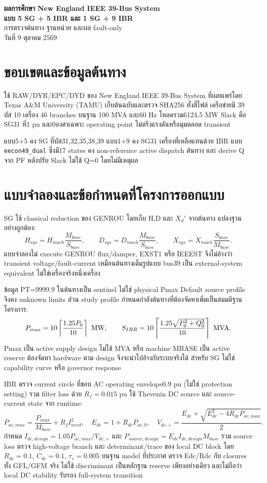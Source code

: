 \documentclass[12pt,a4paper]{article}
\begin{document}
\begin{center}
{\Large\bfseries ผลการศึกษา New England IEEE 39-Bus System\\แบบ 5 SG + 5 IBR และ 1 SG + 9 IBR}\\[6pt]
การตรวจต้นทาง ฐานหน่วย และผล fault-only\\
วันที่ 9 ตุลาคม 2569
\end{center}
\section{ขอบเขตและข้อมูลต้นทาง}
ใช้ RAW/DYR/EPC/DYD ของ New England IEEE 39-Bus System ที่เผยแพร่โดย Texas A\&M University (TAMU) เก็บต้นฉบับและตรวจ SHA256 ทั้งสี่ไฟล์ เครือข่ายมี 39 บัส 10 เครื่อง 46 branches บนฐาน 100 MVA และ60 Hz โหลดรวม6124.5 MW Slack คือ SG31 ที่1 pu และ0องศาเฉพาะ operating point ไม่ตรึงแรงดันหรือมุมตลอด transient

แบบ5+5 คง SG ที่บัส31,32,35,38,39 แบบ1+9 คง SG31 เครื่องที่เหลือแทนด้วย IBR แบบ \texttt{eecon49\_dual} ซึ่งมี17 states คง non-reference active dispatch ต้นทาง และ derive Q จาก PF หลังปรับ Slack ไม่ใช้ Q=0 โดยไม่มีเหตุผล

\section{แบบจำลองและข้อกำหนดที่โครงการออกแบบ}
SG ใช้ classical reduction ของ GENROU โดยเก็บ H,D และ $X_d'$ จากต้นทาง แปลงฐานอย่างถูกต้อง:
\[
H_{sys}=H_{mach}\frac{M_{base}}{S_{base}},\qquad
D_{sys}=D_{mach}\frac{M_{base}}{S_{base}},\qquad
X_{sys}=X_{mach}\frac{S_{base}}{M_{base}}.
\]
แบบจำลองไม่ execute GENROU flux/damper, EXST1 หรือ IEEEST จึงไม่อ้างว่า transient voltage/fault-current เหมือนต้นทางเต็มรูปแบบ bus39 เป็น external-system equivalent ไม่ใช่เครื่องจริงหนึ่งเครื่อง

ข้อมูล PT=9999.9 ในต้นทางเป็น sentinel ไม่ใช่ physical Pmax Default source profile จึงคง unknown limits ส่วน study profile กำหนดกำลังต้นทางที่ต้องจัดหาเพิ่มเป็นสมมติฐานโครงการ:
\[
P_{max}=10\left\lceil\frac{1.25P_0}{10}\right\rceil\ {\rm MW},\qquad
S_{IBR}=10\left\lceil\frac{1.25\sqrt{P_0^2+Q_0^2}}{10}\right\rceil\ {\rm MVA}.
\]
Pmax เป็น active supply design ไม่ใช้ MVA หรือ machine MBASE เป็น active reserve ต้องจัดหา hardware ตาม design จึงจะนำไปอ้างกับระบบจริงได้ สำหรับ SG ไม่ใช่ capability curve หรือ governor response

IBR ตรวจ current circle ที่ขอบ AC operating envelope0.9 pu (ไม่ใช่ protection setting) รวม filter loss ด้วย $R_f=0.015$ pu ใช้ Thevenin DC source และ source-current state จาก runtime:
\[
P_{ac,max}=\frac{P_{max}}{M_{base}}+R_f I_{need}^2,\quad
E_{dc}=1+R_{dc}P_{ac,0},\quad
V_{dc,+}=\frac{E_{dc}+\sqrt{E_{dc}^2-4R_{dc}P_{ac,max}}}{2}.
\]
กำหนด $I_{dc,design}=1.05P_{ac,max}/V_{dc,+}$ และ $P_{source,design}=E_{dc}I_{dc,design}M_{base}$ รวม source loss ตรวจ high-voltage branch และ determinant/trace ของ local DC block โดย $R_{dc}=0.1$, $C_{dc}=0.1$, $\tau_s=0.005$ บนฐาน model ที่ประกาศ ตรวจ Edc/Rdc กับ closures ทั้ง GFL/GFM จริง ไม่ใช้ discriminant เป็นหลักฐาน reserve เพียงอย่างเดียว และไม่ถือว่า local DC stability รับรอง full-system transition
\end{document}
